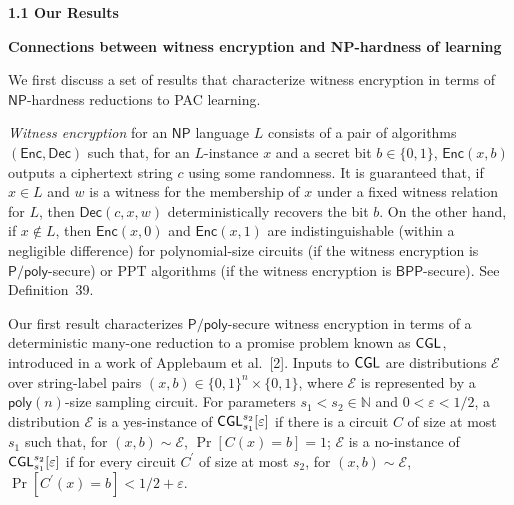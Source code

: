 \par\medskip\noindent\textbf{
1.1 Our Results}\par




\par\medskip\noindent\textbf{Connections between witness encryption and NP-hardness of learning}\par




We first discuss a set of results that characterize witness encryption in terms of ${\mathsf{NP}}$-hardness reductions to PAC learning.\par




\emph{Witness encryption} for an ${\mathsf{NP}}$ language $L$ consists of a pair of algorithms $({\mathsf{Enc}},{\mathsf{Dec}})$ such that, for an $L$-instance $x$ and a secret bit $b\in\{0,1\}$, ${\mathsf{Enc}}(x,b)$ outputs a ciphertext string $c$ using some randomness. It is guaranteed that, if $x\in L$ and $w$ is a witness for the membership of $x$ under a fixed witness relation for $L$, then ${\mathsf{Dec}}(c,x,w)$ deterministically recovers the bit $b$. On the other hand, if $x\notin L$, then ${\mathsf{Enc}}(x,0)$ and ${\mathsf{Enc}}(x,1)$ are indistinguishable (within a negligible difference) for polynomial-size circuits (if the witness encryption is ${\mathsf{P}}/{\mathsf{poly}}$-secure) or PPT algorithms (if the witness encryption is ${\mathsf{BPP}}$-secure). See Definition 39.\par




Our first result characterizes ${\mathsf{P}}/{\mathsf{poly}}$-secure witness encryption in terms of a deterministic many-one reduction to a promise problem known as ${\sf CGL}$, introduced in a work of Applebaum et al. [2]. Inputs to ${\sf CGL}$ are distributions $\mathcal{E}$ over string-label pairs $(x,b)\in\{0,1\}^{n}\times\{0,1\}$, where $\mathcal{E}$ is represented by a ${\mathsf{poly}}(n)$-size sampling circuit. For parameters $s_{1}<s_{2}\in\mathbb{N}$ and $0<\varepsilon<1/2$, a distribution $\mathcal{E}$ is a yes-instance of ${\sf CGL}_{s_{1}}^{s_{2}}[\varepsilon]$ if there is a circuit $C$ of size at most $s_{1}$ such that, for $(x,b)\sim\mathcal{E}$, $\Pr[C(x)=b]=1$; $\mathcal{E}$ is a no-instance of ${\sf CGL}_{s_{1}}^{s_{2}}[\varepsilon]$ if for every circuit $C^{\prime}$ of size at most $s_{2}$, for $(x,b)\sim\mathcal{E}$, $\Pr[C^{\prime}(x)=b]<1/2+\varepsilon$.\par





